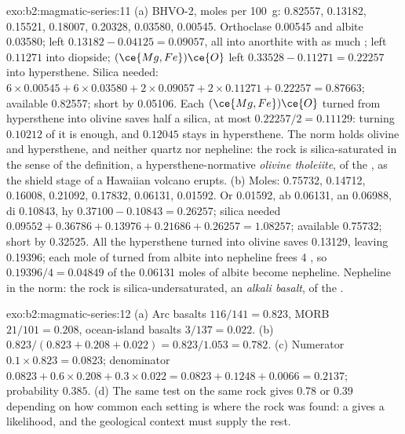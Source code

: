 \begin{solution}{exo:b2:magmatic-series:11}
(a) BHVO-2, moles per \qty{100}{g}:  0.82557,  0.13182, 
0.15521,  0.18007,  0.20328,  0.03580,  0.00545.
Orthoclase 0.00545 and albite 0.03580;  left $0.13182 - 0.04125 = 0.09057$,
all into anorthite with as much ;  left $0.11271$ into diopside;
$(\ce{Mg,Fe})\ce{O}$ left $0.33528 - 0.11271 = 0.22257$ into hypersthene. Silica
needed: $6\times0.00545 + 6\times0.03580 + 2\times0.09057 + 2\times0.11271 + 0.22257 =
0.87663$; available 0.82557; short by 0.05106. Each $(\ce{Mg,Fe})\ce{O}$ turned from
hypersthene into olivine saves half a silica, at most $0.22257/2 = 0.11129$: turning
$0.10212$ of it is enough, and $0.12045$ stays in hypersthene. The norm holds olivine
and hypersthene, and neither quartz nor nepheline: the rock is silica-saturated in the
sense of the definition, a hypersthene-normative \emph{olivine tholeiite}, of the
, as the shield stage of a Hawaiian volcano erupts. (b) Moles: 0.75732, 0.14712, 0.16008, 0.21092, 0.17832, 0.06131,
0.01592. Or 0.01592, ab 0.06131, an 0.06988, di 0.10843, hy $0.37100 - 0.10843 =
0.26257$; silica needed $0.09552 + 0.36786 + 0.13976 + 0.21686 + 0.26257 = 1.08257$;
available 0.75732; short by 0.32525. All the hypersthene turned into olivine saves
0.13129, leaving 0.19396; each mole of  turned from albite into nepheline
frees 4 , so $0.19396/4 = 0.04849$
of the 0.06131 moles of albite  become nepheline. Nepheline in the norm: the
rock is silica-undersaturated, an \emph{alkali basalt}, of the .
\end{solution}

\begin{solution}{exo:b2:magmatic-series:12}
(a) Arc basalts $116/141 = 0.823$, MORB $21/101 = 0.208$, ocean-island basalts
$3/137 = 0.022$. (b) $0.823/(0.823 + 0.208 + 0.022) = 0.823/1.053 = 0.782$.
(c) Numerator $0.1\times0.823 = 0.0823$; denominator $0.0823 + 0.6\times0.208 +
0.3\times0.022 = 0.0823 + 0.1248 + 0.0066 = 0.2137$; probability $0.385$. (d) The
same test on the same rock gives 0.78 or 0.39 depending on how common each setting
is where the rock was found: a  gives a likelihood, and the
geological context must supply the rest.
\end{solution}

